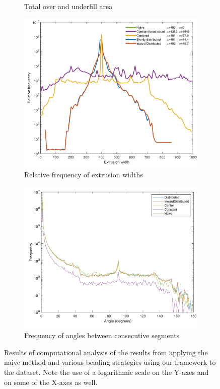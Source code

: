 \begin{figure}
\begin{subfigure}{\figwidth}
\caption{Total over and underfill area}
\label{over_underfill}
\end{subfigure}
\begin{subfigure}{\figwidth}\centering
\includegraphics[height=\figheight]{sources/validation/widthHistogram.pdf}
\caption{Relative frequency of extrusion widths}
\label{widthHistogram}
\end{subfigure}
\begin{subfigure}{\figwidth}\centering
\includegraphics[height=\figheight]{sources/validation/smoothness.pdf}
\caption{Frequency of angles between consecutive segments}
\label{smoothness}
\end{subfigure}
\caption{
Results of computational analysis of the results from applying the naive method and various beading strategies using our framework to the dataset.
Note the use of a logarithmic scale on the Y-axes and on some of the X-axes as well.
}
\end{figure}


